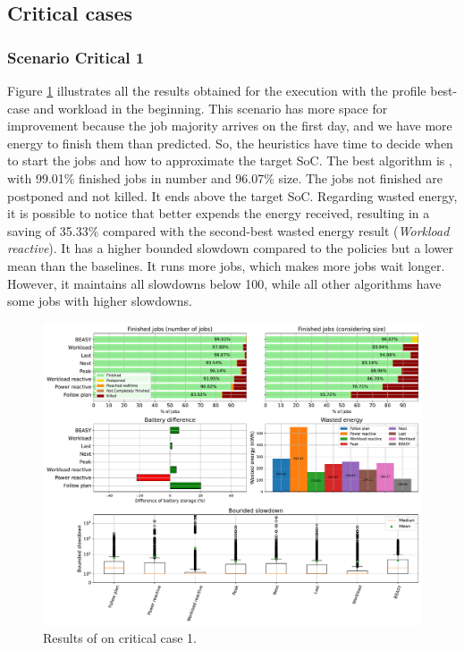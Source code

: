 \subsection{Critical cases}

\subsubsection{Scenario Critical 1}

Figure \ref{fig:beasy_critical_1} illustrates all the results obtained for the execution with the profile best-case and workload in the beginning. This scenario has more space for improvement because the job majority arrives on the first day, and we have more energy to finish them than predicted. So, the heuristics have time to decide when to start the jobs and how to approximate the target SoC. The best algorithm is \emph{\systemName}, with 99.01\% finished jobs in number and 96.07\% size. The jobs not finished are postponed and not killed. It ends above the target SoC. Regarding wasted energy, it is possible to notice that \emph{\systemName} better expends the energy received, resulting in a saving of 35.33\% compared with the second-best wasted energy result (\emph{Workload reactive}). It has a higher bounded slowdown compared to the policies but a lower mean than the baselines. It runs more jobs, which makes more jobs wait longer. However, it maintains all slowdowns below 100, while all other algorithms have some jobs with higher slowdowns.

\begin{figure}[!htb]
    \centering
    \includegraphics[scale=0.39]{Images/Heuristic/profile_best_workload_1_with_noise.pdf}
    \caption{Results of \emph{\systemName} on critical case 1.}
    \label{fig:beasy_critical_1}
\end{figure}


